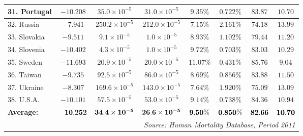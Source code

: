\documentclass[12pt, titlepage]{article}%
\begin{document}
\begin{table}
\begin{center}
\begin{tabular}{||l|c|c|c|c|c|c|c||}
31. Portugal &  $-10.208$ & $35.0\times10^{-5}$ & $31.0\times10^{-5}$ & $9.35\%$ & $0.722\%$ & $83.87$ & $10.70$\\ \hline
32. Russia &  $-7.941$ & $250.2\times10^{-5}$ & $212.0\times10^{-5}$ & $7.15\%$ & $2.161\%$ & $74.18$ & $13.99$\\ \hline
33. Slovakia &  $-9.511$ & $9.1\times10^{-5}$ & $1.0\times10^{-5}$ & $8.93\%$ & $1.102\%$ & $79.44$ & $11.20$\\ \hline
34. Slovenia &  $-10.402$ & $4.3\times10^{-5}$ & $1.0\times10^{-5}$ & $9.72\%$ & $0.703\%$ & $83.03$ & $10.29$\\ \hline
35. Sweden &  $-11.693$ & $20.9\times10^{-5}$ & $20.0\times10^{-5}$ & $11.07\%$ & $0.431\%$ & $85.76$ & $9.04$\\ \hline
36. Taiwan &  $-9.735$ & $92.5\times10^{-5}$ & $86.0\times10^{-5}$ & $8.69\%$ & $0.856\%$ & $83.88$ & $11.50$\\ \hline
37. Ukraine &  $-8.307$ & $169.6\times10^{-5}$ & $143.0\times10^{-5}$ & $7.64\%$ & $1.920\%$ & $75.09$ & $13.09$\\ \hline
38. U.S.A. &  $-10.101$ & $57.5\times10^{-5}$ & $53.0\times10^{-5}$ & $9.14\%$ & $0.738\%$ & $84.36$ & $10.94$\\ \hline
{\bf Average:} & $\bf -10.252$ & $\bf 34.4\times10^{-5}$ & $\bf 26.6\times10^{-5}$ & $\bf 9.50\%$ & $\bf 0.850\%$ & $\bf 82.66$ & $\bf 10.70$\\ \hline
\hline
\multicolumn{8}{||r||}{{\em Source: Human Mortality Database, Period 2011}} \\ \hline\hline
\end{tabular}
\label{lab1}
\smallskip
\end{center}
\end{table}
\end{document}
